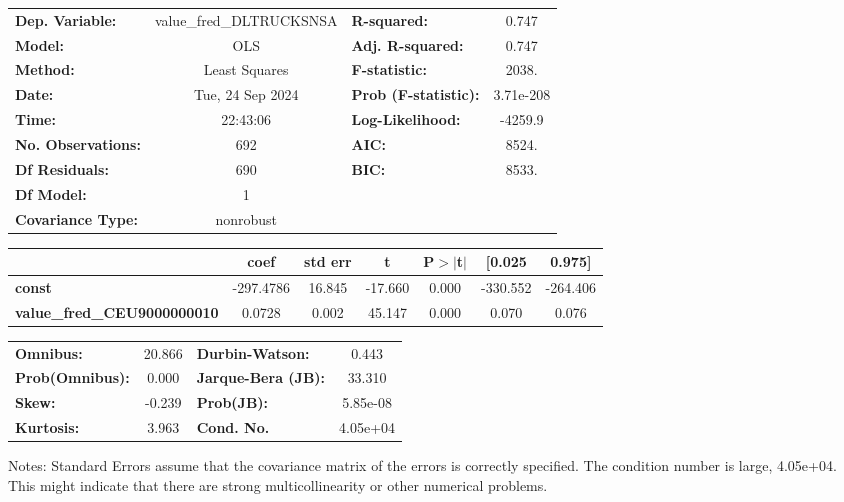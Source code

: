 \begin{center}
\begin{tabular}{lclc}
\toprule
\textbf{Dep. Variable:}             & value\_fred\_DLTRUCKSNSA & \textbf{  R-squared:         } &     0.747   \\
\textbf{Model:}                     &           OLS            & \textbf{  Adj. R-squared:    } &     0.747   \\
\textbf{Method:}                    &      Least Squares       & \textbf{  F-statistic:       } &     2038.   \\
\textbf{Date:}                      &     Tue, 24 Sep 2024     & \textbf{  Prob (F-statistic):} & 3.71e-208   \\
\textbf{Time:}                      &         22:43:06         & \textbf{  Log-Likelihood:    } &   -4259.9   \\
\textbf{No. Observations:}          &             692          & \textbf{  AIC:               } &     8524.   \\
\textbf{Df Residuals:}              &             690          & \textbf{  BIC:               } &     8533.   \\
\textbf{Df Model:}                  &               1          & \textbf{                     } &             \\
\textbf{Covariance Type:}           &        nonrobust         & \textbf{                     } &             \\
\bottomrule
\end{tabular}
\begin{tabular}{lcccccc}
                                    & \textbf{coef} & \textbf{std err} & \textbf{t} & \textbf{P$> |$t$|$} & \textbf{[0.025} & \textbf{0.975]}  \\
\midrule
\textbf{const}                      &    -297.4786  &       16.845     &   -17.660  &         0.000        &     -330.552    &     -264.406     \\
\textbf{value\_fred\_CEU9000000010} &       0.0728  &        0.002     &    45.147  &         0.000        &        0.070    &        0.076     \\
\bottomrule
\end{tabular}
\begin{tabular}{lclc}
\textbf{Omnibus:}       & 20.866 & \textbf{  Durbin-Watson:     } &    0.443  \\
\textbf{Prob(Omnibus):} &  0.000 & \textbf{  Jarque-Bera (JB):  } &   33.310  \\
\textbf{Skew:}          & -0.239 & \textbf{  Prob(JB):          } & 5.85e-08  \\
\textbf{Kurtosis:}      &  3.963 & \textbf{  Cond. No.          } & 4.05e+04  \\
\bottomrule
\end{tabular}
\end{center}

Notes: \newline
 [1] Standard Errors assume that the covariance matrix of the errors is correctly specified. \newline
 [2] The condition number is large, 4.05e+04. This might indicate that there are \newline
 strong multicollinearity or other numerical problems.